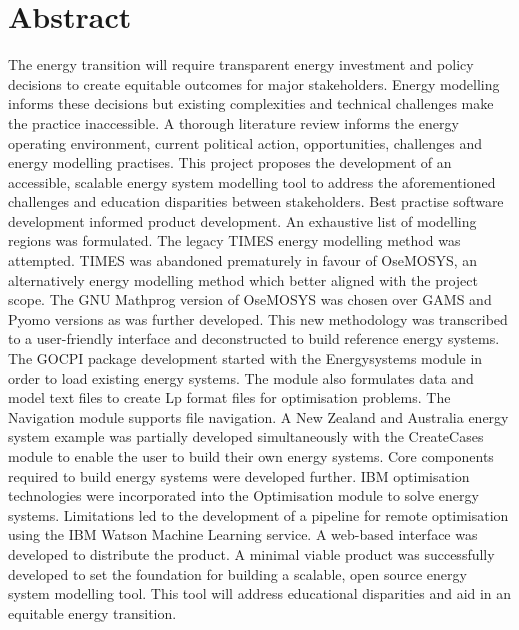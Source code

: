 \documentclass[12pt]{article}
\begin{document}
\section*{Abstract}
The energy transition will require transparent energy investment and policy decisions to create equitable outcomes for major stakeholders.
Energy modelling informs these decisions but existing complexities and technical challenges make the practice inaccessible.
A thorough literature review informs the energy operating environment, current political action, opportunities, challenges and energy modelling practises.
This project proposes the development of an accessible, scalable energy system modelling tool to address the aforementioned challenges and education disparities between stakeholders.
Best practise software development informed product development.
An exhaustive list of modelling regions was formulated. 
The legacy TIMES energy modelling method was attempted.
TIMES was abandoned prematurely in favour of OseMOSYS, an alternatively energy modelling method which better aligned with the project scope.
The GNU Mathprog version of OseMOSYS was chosen over GAMS and Pyomo versions as was further developed.
This new methodology was transcribed to a user-friendly interface and deconstructed to build reference energy systems.
The GOCPI package development started with the Energysystems module in order to load existing energy systems. The module also formulates data and model text files to create Lp format files for optimisation problems. The Navigation module supports file navigation.
A New Zealand and Australia energy system example was partially developed simultaneously with the CreateCases module to enable the user to build their own energy systems. 
Core components required to build energy systems were developed further. 
IBM optimisation technologies were incorporated into the Optimisation module to solve energy systems. 
Limitations led to the development of a pipeline for remote optimisation using the IBM Watson Machine Learning service. 
A web-based interface was developed to distribute the product. 
A minimal viable product was successfully developed to set the foundation for building a scalable, open source energy system modelling tool. 
This tool will address educational disparities and aid in an equitable energy transition.

\newpage
\end{document}
